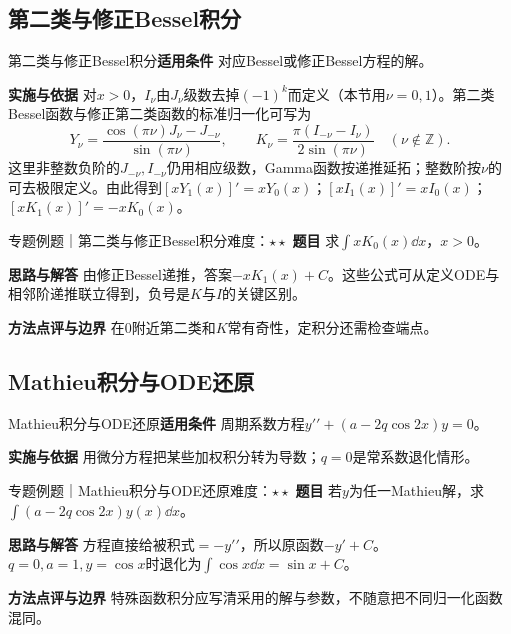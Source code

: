 \subsection{第二类与修正Bessel积分}\label{mat:advanced_integral_algebra:modbessel}
\begin{method}{第二类与修正Bessel积分}\textbf{适用条件} 对应Bessel或修正Bessel方程的解。\par\textbf{实施与依据} 对$x>0$，$I_\nu$由$J_\nu$级数去掉$(-1)^k$而定义（本节用$\nu=0,1$）。第二类Bessel函数与修正第二类函数的标准归一化可写为
\[
Y_\nu=\dfrac{\cos(\pi\nu)J_\nu-J_{-\nu}}{\sin(\pi\nu)},
\qquad
K_\nu=\dfrac{\pi(I_{-\nu}-I_\nu)}{2\sin(\pi\nu)}
\quad(\nu\notin\mathbb Z).
\]
这里非整数负阶的$J_{-\nu},I_{-\nu}$仍用相应级数，Gamma函数按递推延拓；整数阶按$\nu$的可去极限定义。由此得到$[xY_1(x)]\prime=xY_0(x)$；$[xI_1(x)]\prime=xI_0(x)$；$[xK_1(x)]\prime=-xK_0(x)$。\end{method}
\begin{example}{专题例题｜第二类与修正Bessel积分}{难度：$\star\star$}
\textbf{题目} 求$\int xK_0(x)\dd x$，$x>0$。\par\textbf{思路与解答} 由修正Bessel递推，答案$-xK_1(x)+C$。这些公式可从定义ODE与相邻阶递推联立得到，负号是$K$与$I$的关键区别。\par\textbf{方法点评与边界} 在0附近第二类和$K$常有奇性，定积分还需检查端点。
\end{example}
\subsection{Mathieu积分与ODE还原}\label{mat:advanced_integral_algebra:mathieu}
\begin{method}{Mathieu积分与ODE还原}\textbf{适用条件} 周期系数方程$y\prime\prime+(a-2q\cos2x)y=0$。\par\textbf{实施与依据} 用微分方程把某些加权积分转为导数；$q=0$是常系数退化情形。\end{method}
\begin{example}{专题例题｜Mathieu积分与ODE还原}{难度：$\star\star$}
\textbf{题目} 若$y$为任一Mathieu解，求$\int(a-2q\cos2x)y(x)\dd x$。\par\textbf{思路与解答} 方程直接给被积式$=-y\prime\prime$，所以原函数$-y\prime+C$。$q=0,a=1,y=\cos x$时退化为$\int\cos x\dd x=\sin x+C$。\par\textbf{方法点评与边界} 特殊函数积分应写清采用的解与参数，不随意把不同归一化函数混同。
\end{example}
